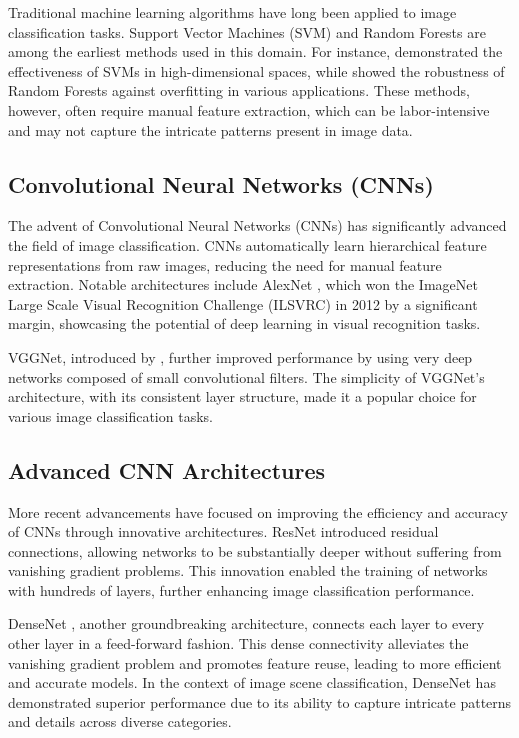 \documentclass[conference]{IEEEtran}
\begin{document}
Traditional machine learning algorithms have long been applied to image classification tasks. Support Vector Machines (SVM) and Random Forests are among the earliest methods used in this domain. For instance, \cite{boser1992training} demonstrated the effectiveness of SVMs in high-dimensional spaces, while \cite{breiman2001random} showed the robustness of Random Forests against overfitting in various applications. These methods, however, often require manual feature extraction, which can be labor-intensive and may not capture the intricate patterns present in image data.

\subsection{Convolutional Neural Networks (CNNs)}

The advent of Convolutional Neural Networks (CNNs) has significantly advanced the field of image classification. CNNs automatically learn hierarchical feature representations from raw images, reducing the need for manual feature extraction. Notable architectures include AlexNet \cite{krizhevsky2012imagenet}, which won the ImageNet Large Scale Visual Recognition Challenge (ILSVRC) in 2012 by a significant margin, showcasing the potential of deep learning in visual recognition tasks. 

VGGNet, introduced by \cite{simonyan2014very}, further improved performance by using very deep networks composed of small convolutional filters. The simplicity of VGGNet’s architecture, with its consistent layer structure, made it a popular choice for various image classification tasks.

\subsection{Advanced CNN Architectures}

More recent advancements have focused on improving the efficiency and accuracy of CNNs through innovative architectures. ResNet \cite{he2016deep} introduced residual connections, allowing networks to be substantially deeper without suffering from vanishing gradient problems. This innovation enabled the training of networks with hundreds of layers, further enhancing image classification performance.

DenseNet \cite{huang2017densely}, another groundbreaking architecture, connects each layer to every other layer in a feed-forward fashion. This dense connectivity alleviates the vanishing gradient problem and promotes feature reuse, leading to more efficient and accurate models. In the context of image scene classification, DenseNet has demonstrated superior performance due to its ability to capture intricate patterns and details across diverse categories.
\end{document}
